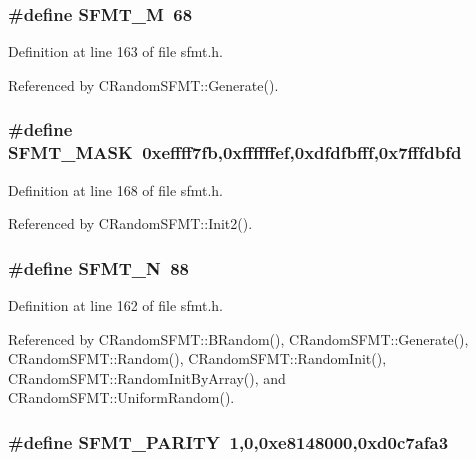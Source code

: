 \subsubsection[{S\-F\-M\-T\-\_\-\-M}]{\setlength{\rightskip}{0pt plus 5cm}\#define S\-F\-M\-T\-\_\-\-M~68}\label{rnd_2sfmt_8h_aa1d6a9c39d7d7aba10f5c1dea7429e3d}


Definition at line 163 of file sfmt.\-h.



Referenced by C\-Random\-S\-F\-M\-T\-::\-Generate().

\subsubsection[{S\-F\-M\-T\-\_\-\-M\-A\-S\-K}]{\setlength{\rightskip}{0pt plus 5cm}\#define S\-F\-M\-T\-\_\-\-M\-A\-S\-K~0xeffff7fb,0xffffffef,0xdfdfbfff,0x7fffdbfd}\label{rnd_2sfmt_8h_ab1053925a594969b35637310ca032c31}


Definition at line 168 of file sfmt.\-h.



Referenced by C\-Random\-S\-F\-M\-T\-::\-Init2().

\subsubsection[{S\-F\-M\-T\-\_\-\-N}]{\setlength{\rightskip}{0pt plus 5cm}\#define S\-F\-M\-T\-\_\-\-N~88}\label{rnd_2sfmt_8h_a499c7434eb486e922fa75b1c439f2b27}


Definition at line 162 of file sfmt.\-h.



Referenced by C\-Random\-S\-F\-M\-T\-::\-B\-Random(), C\-Random\-S\-F\-M\-T\-::\-Generate(), C\-Random\-S\-F\-M\-T\-::\-Random(), C\-Random\-S\-F\-M\-T\-::\-Random\-Init(), C\-Random\-S\-F\-M\-T\-::\-Random\-Init\-By\-Array(), and C\-Random\-S\-F\-M\-T\-::\-Uniform\-Random().

\subsubsection[{S\-F\-M\-T\-\_\-\-P\-A\-R\-I\-T\-Y}]{\setlength{\rightskip}{0pt plus 5cm}\#define S\-F\-M\-T\-\_\-\-P\-A\-R\-I\-T\-Y~1,0,0xe8148000,0xd0c7afa3}\label{rnd_2sfmt_8h_a70c14abcd344754935525ef565a2cffa}


